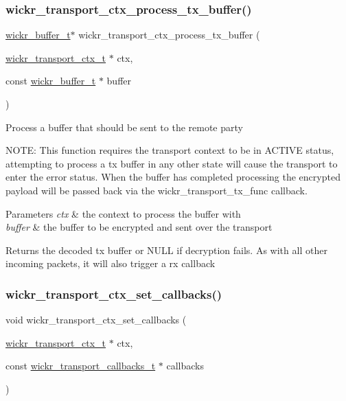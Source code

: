 \subsubsection{\texorpdfstring{wickr\+\_\+transport\+\_\+ctx\+\_\+process\+\_\+tx\+\_\+buffer()}{wickr\_transport\_ctx\_process\_tx\_buffer()}}
{\footnotesize\ttfamily \mbox{\hyperlink{structwickr__buffer}{wickr\+\_\+buffer\+\_\+t}}$\ast$ wickr\+\_\+transport\+\_\+ctx\+\_\+process\+\_\+tx\+\_\+buffer (\begin{DoxyParamCaption}\item[{\mbox{\hyperlink{structwickr__transport__ctx}{wickr\+\_\+transport\+\_\+ctx\+\_\+t}} $\ast$}]{ctx,  }\item[{const \mbox{\hyperlink{structwickr__buffer}{wickr\+\_\+buffer\+\_\+t}} $\ast$}]{buffer }\end{DoxyParamCaption})}

Process a buffer that should be sent to the remote party

N\+O\+TE\+: This function requires the transport context to be in A\+C\+T\+I\+VE status, attempting to process a tx buffer in any other state will cause the transport to enter the error status. When the buffer has completed processing the encrypted payload will be passed back via the wickr\+\_\+transport\+\_\+tx\+\_\+func callback.


\begin{DoxyParams}{Parameters}
{\em ctx} & the context to process the buffer with \\
\hline
{\em buffer} & the buffer to be encrypted and sent over the transport \\
\hline
\end{DoxyParams}
\begin{DoxyReturn}{Returns}
the decoded tx buffer or N\+U\+LL if decryption fails. As with all other incoming packets, it will also trigger a rx callback 
\end{DoxyReturn}
\mbox{\label{group__wickr__transport__ctx_ga9ed375c418ca58c30ca31c8303c71f92}} 
\subsubsection{\texorpdfstring{wickr\+\_\+transport\+\_\+ctx\+\_\+set\+\_\+callbacks()}{wickr\_transport\_ctx\_set\_callbacks()}}
{\footnotesize\ttfamily void wickr\+\_\+transport\+\_\+ctx\+\_\+set\+\_\+callbacks (\begin{DoxyParamCaption}\item[{\mbox{\hyperlink{structwickr__transport__ctx}{wickr\+\_\+transport\+\_\+ctx\+\_\+t}} $\ast$}]{ctx,  }\item[{const \mbox{\hyperlink{structwickr__transport__callbacks}{wickr\+\_\+transport\+\_\+callbacks\+\_\+t}} $\ast$}]{callbacks }\end{DoxyParamCaption})}

